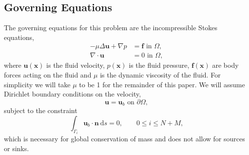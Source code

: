 \documentclass[preprint, 10pt]{elsarticle}
\begin{document}
\subsection{Governing Equations}\label{sec:governing}
The governing equations for this problem are the incompressible Stokes equations,
\begin{subequations}\label{eq:stokes}
\begin{align}
	-\mu\Delta \mathbf{u} + \nabla p &= \mathbf{f} \text{ in }\Omega,\\
	\nabla\cdot\mathbf{u} &= 0 \text{ in }\Omega,
\end{align}
\end{subequations}
where $\mathbf{u}(\mathbf{x})$ is the fluid velocity, $p(\mathbf{x})$ is the fluid pressure, $\mathbf{f}(\mathbf{x})$ are body forces acting on the fluid and $\mu$ is the dynamic viscosity of the fluid. For simplicity we will take $\mu$ to be 1 for the remainder of this paper. We will assume Dirichlet boundary conditions on the velocity,
\begin{equation}\label{eq:boundary_condition}
	 \mathbf{u} = \mathbf{u}_b \text{ on } \partial\Omega,\end{equation}
subject to the constraint 
\begin{equation}\label{eq:compatibility}
	 \int_{\Gamma_i} \mathbf{u}_b\cdot\mathbf{n}~\text{d}s = 0, \qquad 0\leq i \leq N+M,
\end{equation}
which is necessary for global conservation of mass and does not allow for sources or sinks.
\end{document}
